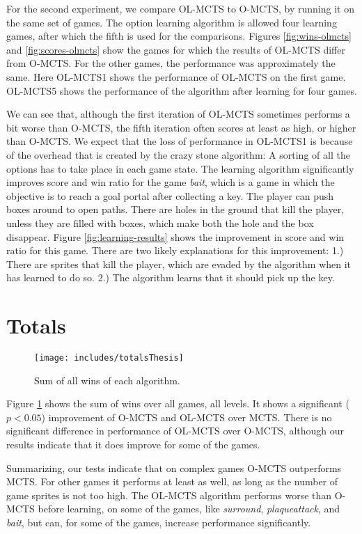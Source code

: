 For the second experiment, we compare OL-MCTS to O-MCTS, by running it on the
same set of games. The option learning algorithm is allowed four learning games,
after which the fifth is used for the comparisons. Figures \ref{fig:wins-olmcts}
and \ref{fig:scores-olmcts} show the games for which the results of OL-MCTS
differ from O-MCTS. For the other games, the performance was approximately the
same. Here OL-MCTS1 shows the performance of OL-MCTS on the first game. OL-MCTS5
shows the performance of the algorithm after learning for four games. 

We can see that, although the first iteration of OL-MCTS sometimes performs a
bit worse than O-MCTS, the fifth iteration often scores at least as high, or
higher than O-MCTS. We expect that the loss of performance in OL-MCTS1 is
because of the overhead that is created by the crazy stone algorithm: A sorting
of all the options has to take place in each game state. The learning algorithm
significantly improves score and win ratio for the game \textit{bait}, which is
a game in which the objective is to reach a goal portal after collecting a key.
The player can push boxes around to open paths. There are holes in the ground
that kill the player, unless they are filled with boxes, which make both the
hole and the box disappear. Figure \ref{fig:learning-results} shows the
improvement in score and win ratio for this game. There are two likely 
explanations for this improvement: 1.) There are sprites that kill the player,
which are evaded by the algorithm when it has learned to do so.  2.) The
algorithm learns that it should pick up the key.

\section{Totals}
\label{subsec:totals}

\begin{figure}
	\centering
	\texttt{[image: includes/totalsThesis]}
	\label{fig:total-results}
	\caption{Sum of all wins of each algorithm.}
\end{figure}

Figure \ref{fig:total-results} shows the sum of wins over all games, all levels.
It shows a significant ($p < 0.05$) improvement of O-MCTS and OL-MCTS over MCTS.
There is no significant difference in performance of OL-MCTS over O-MCTS,
although our results indicate that it does improve for some of the games.

Summarizing, our tests indicate that on complex games O-MCTS outperforms MCTS.
For other games it performs at least as well, as long as the number of game
sprites is not too high. 
The OL-MCTS algorithm performs worse than O-MCTS before learning, on some of the
games, like \textit{surround}, \textit{plaqueattack}, and \textit{bait}, but
can, for some of the games, increase performance significantly.
